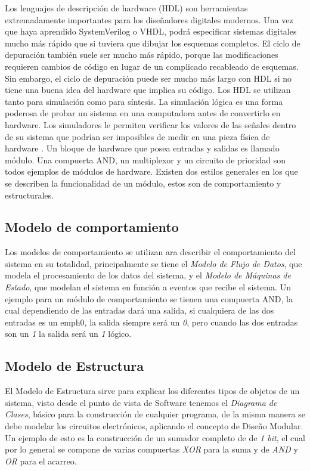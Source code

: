 \documentclass[journal]{IEEEtran}
\begin{document}
	Los lenguajes de descripción de hardware (HDL) son herramientas extremadamente importantes para los diseñadores digitales modernos. Una vez que haya aprendido SystemVerilog o VHDL, podrá especificar sistemas digitales mucho más rápido que si tuviera que dibujar los esquemas completos. El ciclo de depuración también suele ser mucho más rápido, porque las modificaciones requieren cambios de código en lugar de un complicado recableado de esquemas. Sin embargo, el ciclo de depuración puede ser mucho más largo con HDL si no tiene una buena idea del hardware que implica su código. Los HDL se utilizan tanto para simulación como para síntesis. La simulación lógica es una forma poderosa de probar un sistema en una computadora antes de convertirlo en hardware. Los simuladores le permiten verificar los valores de las señales dentro de su sistema que podrían ser imposibles de medir en una pieza física de hardware \cite{harris2010digital}.
	Un bloque de hardware que posea entradas y salidas es llamado módulo. Una compuerta AND, un multiplexor y un circuito de prioridad son todos ejemplos de módulos de hardware. Existen dos estilos generales en los que se describen la funcionalidad de un módulo, estos son de comportamiento y estructurales.
	
	\subsection{Modelo de comportamiento}
	Los modelos de comportamiento se utilizan ara describir el comportamiento del sistema en su totalidad, principalmente se tiene el \emph{Modelo de Flujo de Datos}, que modela el procesamiento de los datos del sistema, y el \emph{Modelo de Máquinas de Estado}, que modelan el sistema en función a eventos que recibe el sistema. Un ejemplo para un módulo de comportamiento se tienen una compuerta AND, la cual dependiendo de las entradas dará una salida, si cualquiera de las dos entradas es un emph{0}, la salida siempre será un \emph{0},  pero cuando las dos entradas son un \emph{1} la salida será un \emph{1} lógico.
	
	\subsection{Modelo de Estructura}
	El Modelo de Estructura sirve para explicar los diferentes tipos de objetos de un sistema, visto desde el punto de vista de Software tenemos el \emph{Diagrama de Clases}, básico para la construcción de cualquier programa, de la misma manera se debe modelar los circuitos electrónicos, aplicando el concepto de Diseño Modular.
	Un ejemplo de esto es la construcción de un sumador completo de de \emph{1 bit}, el cual por lo general se compone de varias compuertas \emph{XOR} para la suma y de \emph{AND} y \emph{OR} para el acarreo.
	
\end{document}
